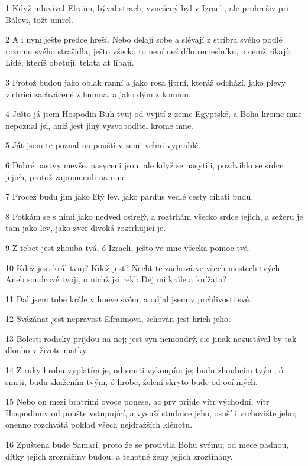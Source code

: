 \par 1 Když mluvíval Efraim, býval strach; vznešený byl v Izraeli, ale prohrešiv pri Bálovi, tožt umrel.
\par 2 A i nyní ješte predce hreší. Nebo delají sobe a slévají z stríbra svého podlé rozumu svého strašidla, ješto všecko to není než dílo remeslníku, o cemž ríkají: Lidé, kteríž obetují, telata at líbají.
\par 3 Protož budou jako oblak ranní a jako rosa jitrní, kteráž odchází, jako plevy vichricí zachvácené z humna, a jako dým z komínu,
\par 4 Ješto já jsem Hospodin Buh tvuj od vyjití z zeme Egyptské, a Boha krome mne nepoznal jsi, aniž jest jiný vysvoboditel krome mne.
\par 5 Ját jsem te poznal na poušti v zemi velmi vyprahlé.
\par 6 Dobré pastvy mevše, nasyceni jsou, ale když se nasytili, pozdvihlo se srdce jejich, protož zapomenuli na mne.
\par 7 Procež budu jim jako lítý lev, jako pardus vedlé cesty cíhati budu.
\par 8 Potkám se s nimi jako nedved osirelý, a roztrhám všecko srdce jejich, a sežeru je tam jako lev, jako zver divoká roztrhující je.
\par 9 Z tebet jest zhouba tvá, ó Izraeli, ješto ve mne všecka pomoc tvá.
\par 10 Kdež jest král tvuj? Kdež jest? Necht te zachová ve všech mestech tvých. Aneb soudcové tvoji, o nichž jsi rekl: Dej mi krále a knížata?
\par 11 Dal jsem tobe krále v hneve svém, a odjal jsem v prchlivosti své.
\par 12 Svázánat jest nepravost Efraimova, schován jest hrích jeho.
\par 13 Bolesti rodicky prijdou na nej; jest syn nemoudrý, sic jinak nezustával by tak dlouho v živote matky.
\par 14 Z ruky hrobu vyplatím je, od smrti vykoupím je; budu zhoubcím tvým, ó smrti, budu zkažením tvým, ó hrobe, želení skryto bude od ocí mých.
\par 15 Nebo on mezi bratrími ovoce ponese, ac prv prijde vítr východní, vítr Hospodinuv od poušte vstupující, a vysuší studnice jeho, osuší i vrchovište jeho; onenno rozchvátá poklad všech nejdražších klénotu.
\par 16 Zpuštena bude Samarí, proto že se protivila Bohu svému; od mece padnou, dítky jejich zrozrážíny budou, a tehotné ženy jejich zroztínány.

